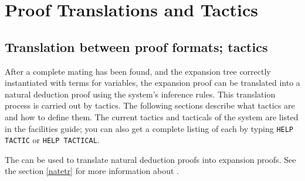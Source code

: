 \chapter{Proof Translations and Tactics}

\section{Translation between proof formats; tactics}\label{tactics}
After a complete mating has been found, and the expansion tree correctly
instantiated with terms for variables, the expansion proof can be
translated into a natural deduction proof using the system's inference
rules.  This translation process is carried out by tactics.  The
following sections describe what tactics are and how to define them.  The
current tactics and tacticals of the system are listed in the facilities guide;
you can also get a complete listing of each by typing {\tt HELP TACTIC} or {\tt HELP TACTICAL}.

The  can be used to
translate natural deduction proofs into expansion proofs.
See the section \ref{natetr} for more information about
.



